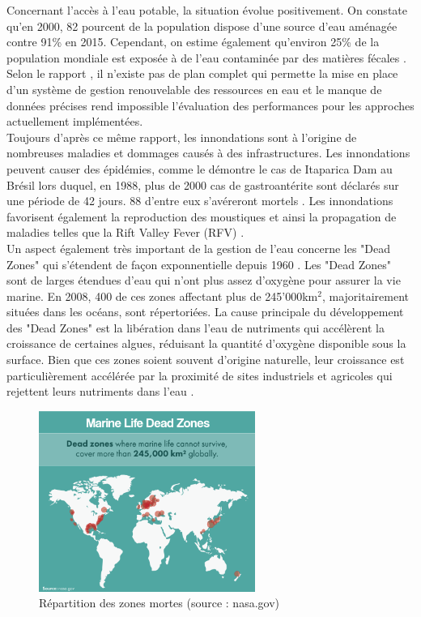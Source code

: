 \documentclass[10pt, article]{llncs}
\begin{document}
			Concernant l'accès à l'eau potable, la situation évolue positivement. On constate qu'en 2000, 82 pourcent de la population dispose d'une source d'eau aménagée contre 91\% en 2015. Cependant, on estime également qu'environ 25\% de la population mondiale est exposée à de l'eau contaminée par des matières fécales \cite{united_nations_goal_nodate-4}. \\
			Selon le rapport \cite{rana_water_2017}, il n'existe pas de plan complet qui permette la mise en place d'un système de gestion renouvelable des ressources en eau et le manque de données précises rend impossible l'évaluation des performances pour les approches actuellement implémentées. \\
			Toujours d'après ce même rapport, les innondations sont à l'origine de nombreuses maladies et dommages causés à des infrastructures. Les innondations peuvent causer des épidémies, comme le démontre le cas de Itaparica Dam au Brésil lors duquel, en 1988, plus de 2000 cas de gastroantérite sont déclarés sur une période de 42 jours. 88 d'entre eux s'avéreront mortels \cite{texeira_gastroenteritis_1993}. Les innondations favorisent également la reproduction des moustiques et ainsi la propagation de maladies telles que la Rift Valley Fever (RFV) \cite{hanafi_rift_2010}.\\
			Un aspect également très important de la gestion de l'eau concerne les "Dead Zones" qui s'étendent de façon exponnentielle depuis 1960 \cite{diaz_spreading_2008}. Les "Dead Zones" sont de larges étendues d'eau qui n'ont plus assez d'oxygène pour assurer la vie marine. En 2008, 400 de ces zones affectant plus de 245'000km$^{2}$, majoritairement situées dans les océans, sont répertoriées. La cause principale du développement des "Dead Zones" est la libération dans l'eau de nutriments qui accélèrent la croissance de certaines algues, réduisant la quantité d'oxygène disponible sous la surface. Bien que ces zones soient souvent d'origine naturelle, leur croissance est particulièrement accélérée par la proximité de sites industriels et agricoles qui rejettent leurs nutriments dans l'eau \cite{rabotyagov_economics_2014}.
			\begin{figure}
				\begin{center}
					\includegraphics[width=200pt]{img/marine-life-dead-zones.png}
				\end{center}
				\caption{Répartition des zones mortes (source : nasa.gov)}
			\end{figure}
\end{document}
